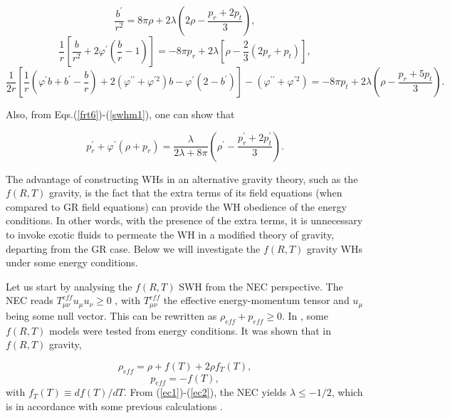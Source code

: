 \documentclass[aps,preprint,onecolumn,11pt,showkeys]{revtex4}%
\begin{document}
\begin{equation}
\label{swhfrt1}\frac{b^{\prime}}{r^{2}}=8\pi\rho+2\lambda\left(  2\rho
-\frac{p_{r}+2p_{t}}{3}\right)  ,
\end{equation}
\begin{equation}
\label{swhfrt2}\frac{1}{r}\left[  \frac{b}{r^{2}}+2\varphi^{\prime}\left(
\frac{b}{r}-1\right)  \right]  =-8\pi p_{r}+2\lambda\left[  \rho-\frac{2}%
{3}(2p_{r}+p_{t})\right]  ,
\end{equation}
\begin{equation}
\label{swhfrt3}\frac{1}{2r}\left[  \frac{1}{r}\left(  \varphi^{\prime
}b+b^{\prime}-\frac{b}{r}\right)  +2(\varphi^{\prime\prime}+\varphi^{\prime
2})b-\varphi^{\prime}(2-b^{\prime})\right]  -(\varphi^{\prime\prime}%
+\varphi^{\prime2})=-8\pi p_{t}+2\lambda\left(  \rho-\frac{p_{r}+5p_{t}}%
{3}\right)  .
\end{equation}

Also, from Eqs.(\ref{frt6})-(\ref{swhm1}), one can show that

\begin{equation}
p_{r}^{\prime}+\varphi^{\prime}(\rho+p_{r})=\frac{\lambda}{2\lambda+8\pi
}\left(  \rho^{\prime}-\frac{p_{r}^{\prime}+2p_{t}^{\prime}}{3}\right)  .
\label{swhfrt4}%
\end{equation}

The advantage of constructing WHs in an alternative gravity theory, such as the $f(R,T)$ gravity, is the fact that the extra terms of its field equations (when compared to GR field equations) can provide the WH obedience of the energy conditions. In other words, with the presence of the extra terms, it is unnecessary to invoke exotic fluids to permeate the WH in a modified theory of gravity, departing from the GR case. Below we will investigate the $f(R,T)$ gravity WHs under some energy conditions.

Let us start by analysing the $f(R,T)$ SWH from the NEC perspective. The NEC reads $T_{\mu\nu}^{eff}u_\mu u_\nu\geq0$ \cite{morris/1988}, with $T_{\mu\nu}^{eff}$ the effective energy-momentum tensor and $u_\mu$ being some null vector. This can be rewritten as $\rho_{eff}+p_{eff}\geq0$. In \cite{alvarenga/2013}, some $f(R,T)$ models were tested from energy conditions. It was shown that in $f(R,T)$ gravity, 

\begin{equation}\label{ec1}
\rho_{eff}=\rho+f(T)+2\rho f_T(T),
\end{equation}
\begin{equation}\label{ec2}
p_{eff}=-f(T),
\end{equation}
with $f_T(T)\equiv df(T)/dT$. From (\ref{ec1})-(\ref{ec2}), the NEC yields $\lambda\leq-1/2$, which is in accordance with some previous calculations \cite{azizi/2013}.
\end{document}
